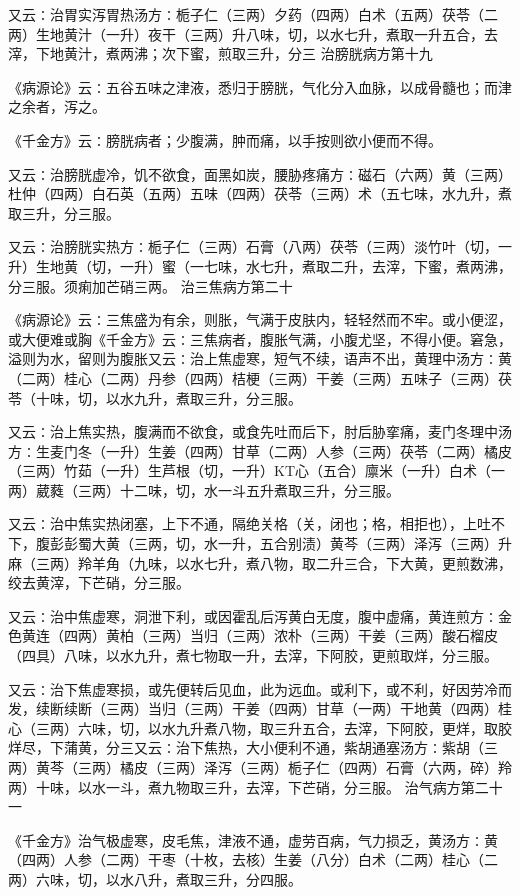 \documentclass[a4paper,12pt,UTF8,twoside]{ctexbook}
\begin{document}
又云∶治胃实泻胃热汤方∶栀子仁（三两）夕药（四两）白术（五两）茯苓（二两）生地黄汁（一升）夜干（三两）升八味，切，以水七升，煮取一升五合，去滓，下地黄汁，煮两沸；次下蜜，煎取三升，分三
治膀胱病方第十九

《病源论》云∶五谷五味之津液，悉归于膀胱，气化分入血脉，以成骨髓也；而津之余者，泻之。

《千金方》云∶膀胱病者；少腹满，肿而痛，以手按则欲小便而不得。

又云∶治膀胱虚冷，饥不欲食，面黑如炭，腰胁疼痛方∶磁石（六两）黄（三两）杜仲（四两）白石英（五两）五味（四两）茯苓（三两）术（五七味，水九升，煮取三升，分三服。

又云∶治膀胱实热方∶栀子仁（三两）石膏（八两）茯苓（三两）淡竹叶（切，一升）生地黄（切，一升）蜜（一七味，水七升，煮取二升，去滓，下蜜，煮两沸，分三服。须痢加芒硝三两。
治三焦病方第二十

《病源论》云∶三焦盛为有余，则胀，气满于皮肤内，轻轻然而不牢。或小便涩，或大便难或胸《千金方》云∶三焦病者，腹胀气满，小腹尤坚，不得小便。窘急，溢则为水，留则为腹胀又云∶治上焦虚寒，短气不续，语声不出，黄理中汤方∶黄（二两）桂心（二两）丹参（四两）桔梗（三两）干姜（三两）五味子（三两）茯苓（十味，切，以水九升，煮取三升，分三服。

又云∶治上焦实热，腹满而不欲食，或食先吐而后下，肘后胁挛痛，麦门冬理中汤方∶生麦门冬（一升）生姜（四两）甘草（二两）人参（三两）茯苓（二两）橘皮（三两）竹茹（一升）生芦根（切，一升）KT心（五合）廪米（一升）白术（一两）葳蕤（三两）十二味，切，水一斗五升煮取三升，分三服。

又云∶治中焦实热闭塞，上下不通，隔绝关格（关，闭也；格，相拒也），上吐不下，腹彭彭蜀大黄（三两，切，水一升，五合别渍）黄芩（三两）泽泻（三两）升麻（三两）羚羊角（九味，以水七升，煮八物，取二升三合，下大黄，更煎数沸，绞去黄滓，下芒硝，分三服。

又云∶治中焦虚寒，洞泄下利，或因霍乱后泻黄白无度，腹中虚痛，黄连煎方∶金色黄连（四两）黄柏（三两）当归（三两）浓朴（三两）干姜（三两）酸石榴皮（四具）八味，以水九升，煮七物取一升，去滓，下阿胶，更煎取烊，分三服。

又云∶治下焦虚寒损，或先便转后见血，此为远血。或利下，或不利，好因劳冷而发，续断续断（三两）当归（三两）干姜（四两）甘草（一两）干地黄（四两）桂心（三两）六味，切，以水九升煮八物，取三升五合，去滓，下阿胶，更烊，取胶烊尽，下蒲黄，分三又云∶治下焦热，大小便利不通，紫胡通塞汤方∶紫胡（三两）黄芩（三两）橘皮（三两）泽泻（三两）栀子仁（四两）石膏（六两，碎）羚两）十味，以水一斗，煮九物取三升，去滓，下芒硝，分三服。
治气病方第二十一

《千金方》治气极虚寒，皮毛焦，津液不通，虚劳百病，气力损乏，黄汤方∶黄（四两）人参（二两）干枣（十枚，去核）生姜（八分）白术（二两）桂心（二两）六味，切，以水八升，煮取三升，分四服。
\end{document}
